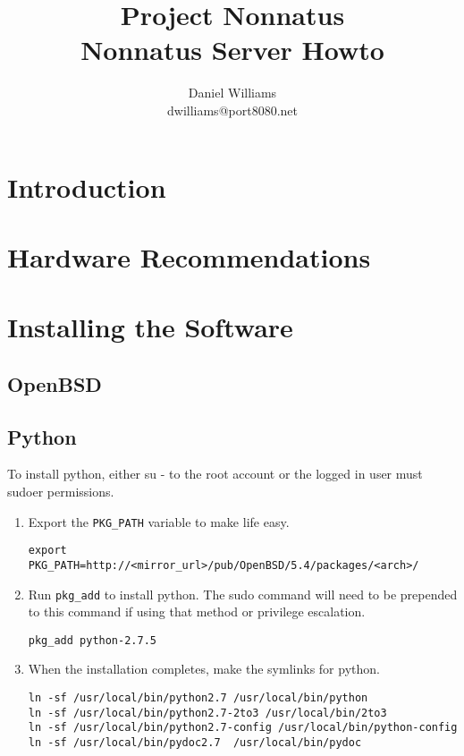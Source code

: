 \documentclass[letterpaper]{article}
\title{Project Nonnatus \\ Nonnatus Server Howto}
\author{Daniel Williams \\ dwilliams@port8080.net}
\begin{document}
\maketitle

\section{Introduction}

\section{Hardware Recommendations}

\section{Installing the Software}

\subsection{OpenBSD}



\subsection{Python}

To install python, either su - to the root account or the logged in user must
sudoer permissions.

\begin{enumerate}

\item
Export the \verb=PKG_PATH= variable to make life easy.
\begin{verbatim}
export PKG_PATH=http://<mirror_url>/pub/OpenBSD/5.4/packages/<arch>/
\end{verbatim}

\item
Run \verb=pkg_add= to install python.  The sudo command will need to be
prepended to this command if using that method or privilege escalation.
\begin{verbatim}
pkg_add python-2.7.5
\end{verbatim}

\item
When the installation completes, make the symlinks for python.
\begin{verbatim}
ln -sf /usr/local/bin/python2.7 /usr/local/bin/python
ln -sf /usr/local/bin/python2.7-2to3 /usr/local/bin/2to3
ln -sf /usr/local/bin/python2.7-config /usr/local/bin/python-config
ln -sf /usr/local/bin/pydoc2.7  /usr/local/bin/pydoc
\end{verbatim}

\end{enumerate}
\end{document}
